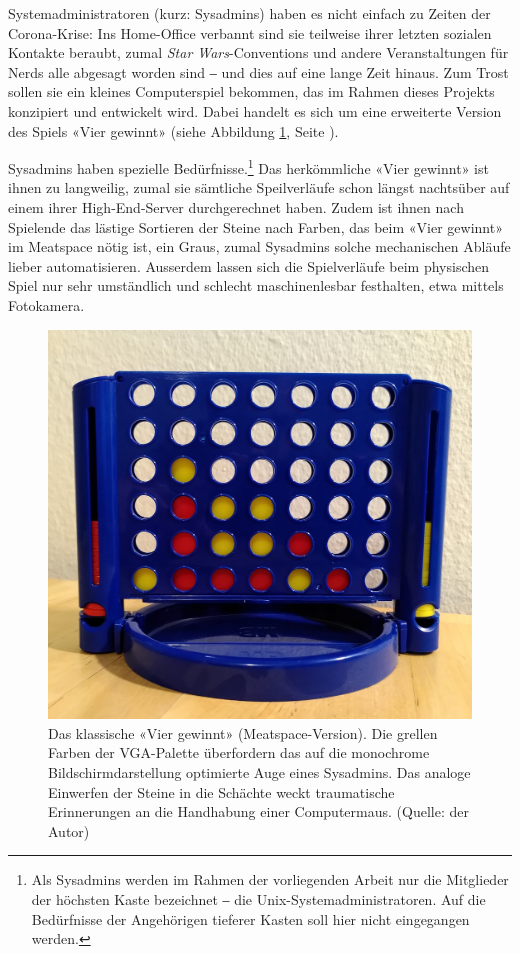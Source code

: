 \documentclass[a4paper,11pt,hidelinks]{scrartcl}
\newcommand{\imgref}[1]{{Abbildung \ref{#1}, Seite \pageref{#1}}}
\begin{document}
Systemadministratoren (kurz: Sysadmins) haben es nicht einfach zu Zeiten der Corona-Krise: Ins Home-Office verbannt sind sie teilweise ihrer letzten sozialen Kontakte beraubt, zumal \textit{Star Wars}-Conventions und andere Veranstaltungen für Nerds alle abgesagt worden sind ‒ und dies auf eine lange Zeit hinaus. Zum Trost sollen sie ein kleines Computerspiel bekommen, das im Rahmen dieses Projekts konzipiert und entwickelt wird. Dabei handelt es sich um eine erweiterte Version des Spiels «Vier gewinnt» (siehe \imgref{fig:vier-gewinnt}).

Sysadmins haben spezielle Bedürfnisse.\footnote{Als Sysadmins werden im Rahmen der vorliegenden Arbeit nur die Mitglieder der höchsten Kaste bezeichnet ‒ die Unix-Systemadministratoren. Auf die Bedürfnisse der Angehörigen tieferer Kasten soll hier nicht eingegangen werden.} Das herkömmliche «Vier gewinnt» ist ihnen zu langweilig, zumal sie sämtliche Speilverläufe schon längst nachtsüber auf einem ihrer High-End-Server durchgerechnet haben. Zudem ist ihnen nach Spielende das lästige Sortieren der Steine nach Farben, das beim «Vier gewinnt» im Meatspace nötig ist, ein Graus, zumal Sysadmins solche mechanischen Abläufe lieber automatisieren. Ausserdem lassen sich die Spielverläufe beim physischen Spiel nur sehr umständlich und schlecht maschinenlesbar festhalten, etwa mittels Fotokamera.

\begin{figure}
    \centering
    \includegraphics[width=1.0\linewidth]{pics/vier-gewinnt.jpg}
    \caption{Das klassische «Vier gewinnt» (Meatspace-Version). Die grellen Farben der VGA-Palette überfordern das auf die monochrome Bildschirmdarstellung optimierte Auge eines Sysadmins. Das analoge Einwerfen der Steine in die Schächte weckt traumatische Erinnerungen an die Handhabung einer Computermaus. (Quelle: der Autor)}
    \label{fig:vier-gewinnt}
\end{figure}
\end{document}
